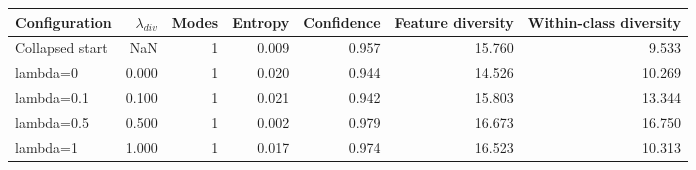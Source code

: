 \begin{tabular}{lrrrrrr}
\toprule
Configuration & $\lambda_{div}$ & Modes & Entropy & Confidence & Feature diversity & Within-class diversity \\
\midrule
Collapsed start & NaN & 1 & 0.009 & 0.957 & 15.760 & 9.533 \\
lambda=0 & 0.000 & 1 & 0.020 & 0.944 & 14.526 & 10.269 \\
lambda=0.1 & 0.100 & 1 & 0.021 & 0.942 & 15.803 & 13.344 \\
lambda=0.5 & 0.500 & 1 & 0.002 & 0.979 & 16.673 & 16.750 \\
lambda=1 & 1.000 & 1 & 0.017 & 0.974 & 16.523 & 10.313 \\
\bottomrule
\end{tabular}
